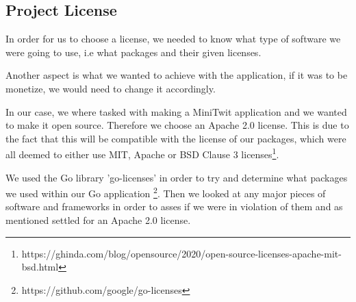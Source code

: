 \subsection{Project License}
In order for us to choose a license, we needed to know what type of software we were going to use, i.e what packages and their given licenses. 

Another aspect is what we wanted to achieve with the application, if it was to be monetize, we would need to change it accordingly.

In our case, we where tasked with making a MiniTwit application and we wanted to make it open source. 
Therefore we choose an Apache 2.0 license. This is due to the fact that this will be compatible with the license of our packages, which were all deemed to either use MIT, Apache or BSD Clause 3 licenses\footnote{https://ghinda.com/blog/opensource/2020/open-source-licenses-apache-mit-bsd.html}. 

We used the Go library 'go-licenses' in order to try and determine what packages we used within our Go application \footnote{https://github.com/google/go-licenses}. 
Then we looked at any major pieces of software and frameworks in order to asses if we were in violation of them and as mentioned settled for an Apache 2.0 license.